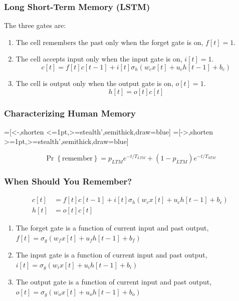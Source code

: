 \documentclass{beamer}
\begin{document}
\begin{frame}
  \frametitle{Long Short-Term Memory (LSTM)}
  The three gates are:
  \begin{enumerate}
  \item The cell remembers the past only when the forget gate is on, $f[t]=1$.
  \item The cell accepts input only when the input gate is on, $i[t]=1$.
    \[
    c[t] = f[t]c[t-1] + i[t]\sigma_h\left(w_cx[t]+u_ch[t-1]+b_c\right)
    \]
  \item The cell is output only when the output gate is on, $o[t]=1$.
    \[
    h[t] = o[t]c[t]
    \]
  \end{enumerate}
\end{frame}
  
\begin{frame}
  \frametitle{Characterizing Human Memory}
  \begin{center}
    =[<-,shorten <=1pt,>=stealth',semithick,draw=blue]
    =[->,shorten >=1pt,>=stealth',semithick,draw=blue]
  \end{center}
  \[
  \Pr\left\{\mbox{remember}\right\}=p_{LTM} e^{-t/T_{LTM}}+ (1-p_{LTM})e^{-t/T_{STM}}
  \]
\end{frame}

\begin{frame}
  \frametitle{When Should You Remember?}
  \begin{align*}
    c[t] &= f[t]c[t-1] + i[t]\sigma_h\left(w_cx[t]+u_ch[t-1]+b_c\right)\\
    h[t] &= o[t]c[t]
  \end{align*}
  \begin{enumerate}
  \item The forget gate is a function of current input and past output,
    $f[t] = \sigma_g\left(w_fx[t]+u_fh[t-1]+b_f\right)$
  \item The input gate is a function of current input and past output,
    $i[t] = \sigma_g\left(w_ix[t]+u_ih[t-1]+b_i\right)$
  \item The output gate is a function of current input and past output,
    $o[t] = \sigma_g\left(w_ox[t]+u_oh[t-1]+b_o\right)$
  \end{enumerate}
\end{frame}
  
\end{document}
